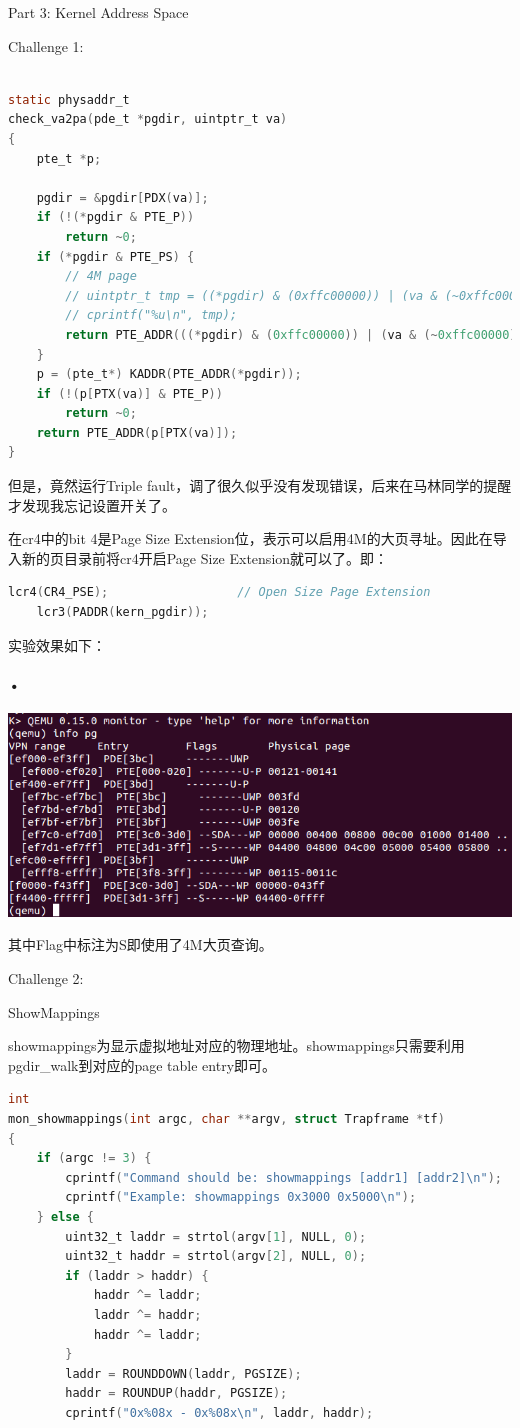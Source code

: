 \documentclass[GBK,winfonts,a4paper,10pt]{ctexart}
\begin{document}
\begin{section}{Part 3: Kernel Address Space}
\begin{subsection}{Challenge 1:}
\begin{lstlisting}[language=C]
                    
static physaddr_t
check_va2pa(pde_t *pgdir, uintptr_t va)
{
	pte_t *p;

	pgdir = &pgdir[PDX(va)];
	if (!(*pgdir & PTE_P))
		return ~0;
	if (*pgdir & PTE_PS) {
		// 4M page
		// uintptr_t tmp = ((*pgdir) & (0xffc00000)) | (va & (~0xffc00000));
		// cprintf("%u\n", tmp);
		return PTE_ADDR(((*pgdir) & (0xffc00000)) | (va & (~0xffc00000)));
	}
	p = (pte_t*) KADDR(PTE_ADDR(*pgdir));
	if (!(p[PTX(va)] & PTE_P))
		return ~0;
	return PTE_ADDR(p[PTX(va)]);
}
\end{lstlisting}
\par
但是，竟然运行Triple fault，调了很久似乎没有发现错误，后来在马林同学的提醒才发现我忘记设置开关了。
\par
在cr4中的bit 4是Page Size Extension位，表示可以启用4M的大页寻址。因此在导入新的页目录前将cr4开启Page Size Extension就可以了。即：
\begin{lstlisting}[language=C]
	lcr4(CR4_PSE);					// Open Size Page Extension
	lcr3(PADDR(kern_pgdir));
\end{lstlisting}
\par
实验效果如下：
\paragraph{•}
\includegraphics[scale=0.5]{PSE.png}
\par
其中Flag中标注为S即使用了4M大页查询。
\end{subsection}

\begin{subsection}{Challenge 2:}
\begin{subsubsection}{ ShowMappings }
\par
showmappings为显示虚拟地址对应的物理地址。showmappings只需要利用pgdir\_walk到对应的page table entry即可。
\begin{lstlisting}[language=C]
int
mon_showmappings(int argc, char **argv, struct Trapframe *tf)
{
    if (argc != 3) {
        cprintf("Command should be: showmappings [addr1] [addr2]\n");
        cprintf("Example: showmappings 0x3000 0x5000\n");
    } else {
        uint32_t laddr = strtol(argv[1], NULL, 0);
        uint32_t haddr = strtol(argv[2], NULL, 0);
        if (laddr > haddr) {
            haddr ^= laddr;
            laddr ^= haddr;
            haddr ^= laddr;
        }
        laddr = ROUNDDOWN(laddr, PGSIZE);
        haddr = ROUNDUP(haddr, PGSIZE);
        cprintf("0x%08x - 0x%08x\n", laddr, haddr);
        

\end{lstlisting}
\end{subsubsection}
\end{subsection}
\end{section}
\end{document}

